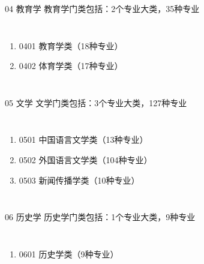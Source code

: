 \documentclass[aspectratio=169]{ctexbeamer} %
\begin{document}
\begin{frame}[t]{04 教育学}
教育学门类包括：2个专业大类，35种专业
\begin{spacing}{1.5} %
\begin{columns}
{\large
\begin{enumerate}[label={\arabic*.}]
\item 0401 教育学类（18种专业）
\item 0402 体育学类（17种专业）
\end{enumerate} 
}
\end{columns}
\end{spacing}
\end{frame}

\begin{frame}[t]{05 文学}
文学门类包括：3个专业大类，127种专业
\begin{spacing}{1.5} %
\begin{columns}
{\large
\begin{enumerate}[label={\arabic*.}]
\item 0501 中国语言文学类（13种专业）
\item 0502 外国语言文学类（104种专业）
\item 0503 新闻传播学类（10种专业）
\end{enumerate} 
}
\end{columns}
\end{spacing}
\end{frame}

\begin{frame}[t]{06 历史学}
历史学门类包括：1个专业大类，9种专业
\begin{spacing}{1.5} %
\begin{columns}
{\large
\begin{enumerate}[label={\arabic*.}]
\item 0601 历史学类（9种专业）
\end{enumerate} 
}
\end{columns}
\end{spacing}
\end{frame}
\end{document}
